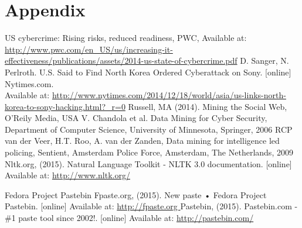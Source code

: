 \documentclass[12pt]{article}
\begin{document}
\newpage
\section{Appendix}
\newpage

\begin{thebibliography}{99}
US cybercrime: Rising risks, reduced readiness, PWC, Available at: \url{http://www.pwc.com/en_US/us/increasing-it-effectiveness/publications/assets/2014-us-state-of-cybercrime.pdf}
	 D. Sanger, N. Perlroth.  U.S. Said to Find North Korea Ordered Cyberattack on Sony. [online] Nytimes.com. \\Available at: \url{http://www.nytimes.com/2014/12/18/world/asia/us-links-north-korea-to-sony-hacking.html?_r=0}
  Russell, MA (2014). Mining the Social Web, O'Reily Media, USA
    V. Chandola et al. Data Mining for Cyber Security, Department of Computer Science, University of Minnesota, Springer, 2006
   RCP van der Veer, H.T. Roo,  A. van der Zanden, Data mining for intelligence led policing, Sentient, Amsterdam Police Force, Amsterdam, The Netherlands, 2009
Nltk.org, (2015). Natural Language Toolkit - NLTK 3.0 documentation. [online] Available at: \url{http://www.nltk.org/}

Fedora Project Pastebin Fpaste.org, (2015). New paste • Fedora Project Pastebin. [online] Available at:  
\url{http://fpaste.org }
Pastebin, (2015). Pastebin.com - \#1 paste tool since 2002!. [online] Available at:     \url{http://pastebin.com/}


\end{thebibliography}
\end{document}
